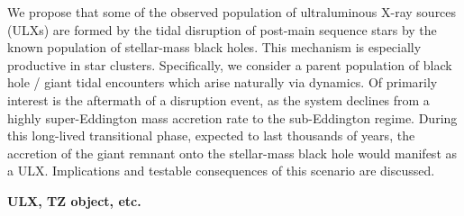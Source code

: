 
We propose that some of the observed population of ultraluminous X-ray sources (ULXs) are formed by the tidal 
disruption of post-main sequence stars by the known population of stellar-mass black holes.  This mechanism is especially productive in star clusters.  Specifically, we consider a parent population of black hole / giant tidal encounters which arise naturally via dynamics.  Of primarily interest is the aftermath of a disruption event, as the system declines from a highly super-Eddington mass accretion rate to the sub-Eddington regime.  During this long-lived transitional phase, expected to last thousands of years, the accretion of the giant remnant onto the stellar-mass black hole would manifest as a ULX.   Implications and testable consequences of this scenario are discussed.



{\bf ULX, TZ object, etc.}

